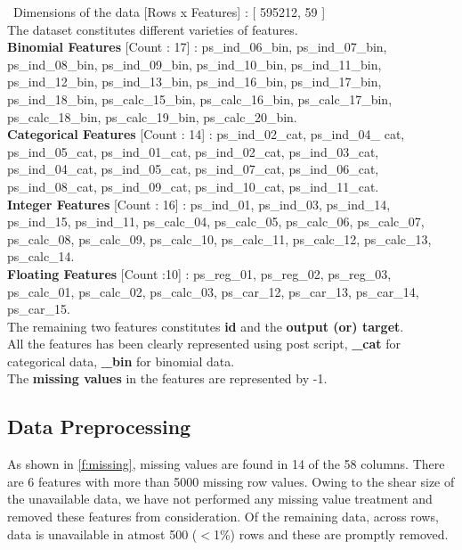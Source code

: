 \ Dimensions of the data [Rows x Features] : [ 595212, 59 ]
\\ \newline The dataset constitutes different varieties of features.
\\ \newline \textbf{Binomial Features} [Count : 17] :  ps\_ind\_06\_bin,  ps\_ind\_07\_bin, ps\_ind\_08\_bin, ps\_ind\_09\_bin, ps\_ind\_10\_bin, ps\_ind\_11\_bin, ps\_ind\_12\_bin, ps\_ind\_13\_bin, ps\_ind\_16\_bin, ps\_ind\_17\_bin, ps\_ind\_18\_bin, ps\_calc\_15\_bin, ps\_calc\_16\_bin, ps\_calc\_17\_bin, ps\_calc\_18\_bin, ps\_calc\_19\_bin, ps\_calc\_20\_bin.
\
\\ \newline \textbf{Categorical Features} [Count : 14] : ps\_ind\_02\_cat,  ps\_ind\_04\_ cat, ps\_ind\_05\_cat, ps\_ind\_01\_cat, ps\_ind\_02\_cat,  ps\_ind\_03\_cat, ps\_ind\_04\_cat, ps\_ind\_05\_cat, ps\_ind\_07\_cat,  ps\_ind\_06\_cat, ps\_ind\_08\_cat, ps\_ind\_09\_cat, ps\_ind\_10\_cat,  ps\_ind\_11\_cat.
\
\\ \newline \textbf{Integer Features} [Count : 16] : ps\_ind\_01, ps\_ind\_03, ps\_ind\_14, ps\_ind\_15, ps\_ind\_11, ps\_calc\_04, ps\_calc\_05, ps\_calc\_06, ps\_calc\_07, ps\_calc\_08, ps\_calc\_09, ps\_calc\_10, ps\_calc\_11, ps\_calc\_12, ps\_calc\_13, ps\_calc\_14.
\
\\ \newline \textbf{Floating Features} [Count :10] : ps\_reg\_01, ps\_reg\_02, ps\_reg\_03, ps\_calc\_01, ps\_calc\_02, ps\_calc\_03, ps\_car\_12, ps\_car\_13, ps\_car\_14, ps\_car\_15.
\\ \newline  The remaining two features constitutes \textbf{id} and the \textbf{output (or) target}. 
\\ \newline All the features has been clearly represented using post script, \textbf{\_cat} for categorical data, \textbf{\_bin} for binomial data.
\\ \newline The \textbf{missing values} in the features are represented by -1.

\subsection{Data Preprocessing}

As shown in \ref{f:missing}, missing values are found in 14 of the 58 columns. There are 6 features with more than 5000 missing row values. Owing to the shear size of the unavailable data, we have not performed any missing value treatment and removed these features from consideration. Of the remaining data, across rows, data is unavailable in atmost 500 ($<$1\%) rows and these are promptly removed.

